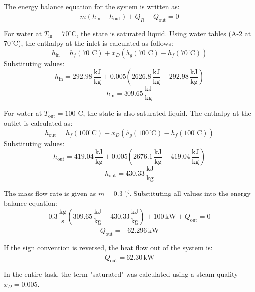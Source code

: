The energy balance equation for the system is written as:  
\[
\dot{m}(h_{\text{in}} - h_{\text{out}}) + \dot{Q}_R + \dot{Q}_{\text{out}} = 0
\]  

For water at \( T_{\text{in}} = 70^\circ\text{C} \), the state is saturated liquid. Using water tables (A-2 at \( 70^\circ\text{C} \)), the enthalpy at the inlet is calculated as follows:  
\[
h_{\text{in}} = h_f(70^\circ\text{C}) + x_D \left( h_g(70^\circ\text{C}) - h_f(70^\circ\text{C}) \right)
\]  
Substituting values:  
\[
h_{\text{in}} = 292.98 \, \frac{\text{kJ}}{\text{kg}} + 0.005 \left( 2626.8 \, \frac{\text{kJ}}{\text{kg}} - 292.98 \, \frac{\text{kJ}}{\text{kg}} \right)
\]  
\[
h_{\text{in}} = 309.65 \, \frac{\text{kJ}}{\text{kg}}
\]  

For water at \( T_{\text{out}} = 100^\circ\text{C} \), the state is also saturated liquid. The enthalpy at the outlet is calculated as:  
\[
h_{\text{out}} = h_f(100^\circ\text{C}) + x_D \left( h_g(100^\circ\text{C}) - h_f(100^\circ\text{C}) \right)
\]  
Substituting values:  
\[
h_{\text{out}} = 419.04 \, \frac{\text{kJ}}{\text{kg}} + 0.005 \left( 2676.1 \, \frac{\text{kJ}}{\text{kg}} - 419.04 \, \frac{\text{kJ}}{\text{kg}} \right)
\]  
\[
h_{\text{out}} = 430.33 \, \frac{\text{kJ}}{\text{kg}}
\]  

The mass flow rate is given as \( \dot{m} = 0.3 \, \frac{\text{kg}}{\text{s}} \). Substituting all values into the energy balance equation:  
\[
0.3 \, \frac{\text{kg}}{\text{s}} \left( 309.65 \, \frac{\text{kJ}}{\text{kg}} - 430.33 \, \frac{\text{kJ}}{\text{kg}} \right) + 100 \, \text{kW} + \dot{Q}_{\text{out}} = 0
\]  
\[
\dot{Q}_{\text{out}} = -62.296 \, \text{kW}
\]  

If the sign convention is reversed, the heat flow out of the system is:  
\[
\dot{Q}_{\text{out}} = 62.30 \, \text{kW}
\]  

In the entire task, the term "saturated" was calculated using a steam quality \( x_D = 0.005 \).